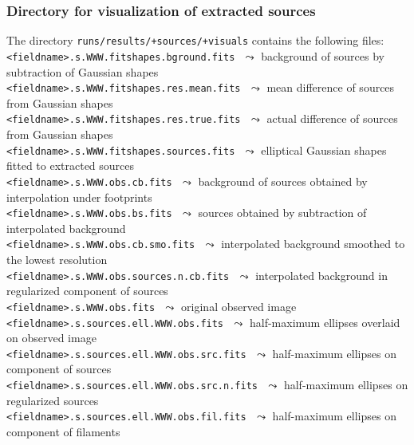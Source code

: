 \documentclass[a4paper,10pt]{article}
\begin{document}
\subsubsection{Directory for visualization of extracted sources}
\label{srcvisuals}

The directory \verb!runs/results/+sources/+visuals! contains the following files:\\

\vspace{-2mm}\noindent
{\small\verb!<fieldname>.s.WWW.fitshapes.bground.fits!} $\,\,\leadsto$ background of sources by subtraction of Gaussian shapes\\
{\small\verb!<fieldname>.s.WWW.fitshapes.res.mean.fits!} $\,\,\leadsto$ mean difference of sources from Gaussian shapes\\
{\small\verb!<fieldname>.s.WWW.fitshapes.res.true.fits!} $\,\,\leadsto$ actual difference of sources from Gaussian shapes\\
{\small\verb!<fieldname>.s.WWW.fitshapes.sources.fits!} $\,\,\leadsto$ elliptical Gaussian shapes fitted to extracted sources\\
{\small\verb!<fieldname>.s.WWW.obs.cb.fits!} $\,\,\leadsto$ background of sources obtained by interpolation under footprints\\
{\small\verb!<fieldname>.s.WWW.obs.bs.fits!} $\,\,\leadsto$ sources obtained by subtraction of interpolated background\\
{\small\verb!<fieldname>.s.WWW.obs.cb.smo.fits!} $\,\,\leadsto$ interpolated background smoothed to the lowest resolution\\
{\small\verb!<fieldname>.s.WWW.obs.sources.n.cb.fits!} $\,\,\leadsto$ interpolated background in regularized component of sources\\
{\small\verb!<fieldname>.s.WWW.obs.fits!} $\,\,\leadsto$ original observed image\\
{\small\verb!<fieldname>.s.sources.ell.WWW.obs.fits!} $\,\,\leadsto$ half-maximum ellipses overlaid on observed image\\
{\small\verb!<fieldname>.s.sources.ell.WWW.obs.src.fits!} $\,\,\leadsto$ half-maximum ellipses on component of sources\\
{\small\verb!<fieldname>.s.sources.ell.WWW.obs.src.n.fits!} $\,\,\leadsto$ half-maximum ellipses on regularized sources\\
{\small\verb!<fieldname>.s.sources.ell.WWW.obs.fil.fits!} $\,\,\leadsto$ half-maximum ellipses on component of filaments\\
\end{document}
